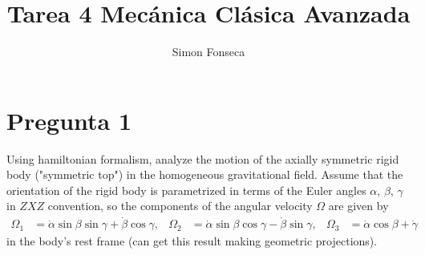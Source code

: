 \documentclass[]{article}
\title{Tarea 4 Mecánica Clásica Avanzada}
\author{Simon Fonseca}
\numberwithin{equation}{section}
\begin{document}
\maketitle
\section{Pregunta 1}
Using hamiltonian formalism, analyze the motion of the axially symmetric rigid body ("symmetric top") in the homogeneous gravitational field. Assume that the orientation of the rigid body is parametrized in terms of the Euler angles $\alpha$, $\beta$, $\gamma$ in $ZXZ$ convention, so the components of the angular velocity $\Omega$ are given by
\begin{align}
	\Omega_1 &= \dot{\alpha} \sin\beta \sin\gamma + \dot{\beta} \cos\gamma, & \Omega_2 &= \dot{\alpha} \sin\beta \cos\gamma - \dot{\beta} \sin\gamma, & \Omega_3 &= \dot{\alpha} \cos\beta + \dot{\gamma}
\end{align}
in the body’s rest frame (can get this result making geometric projections).
\end{document}
